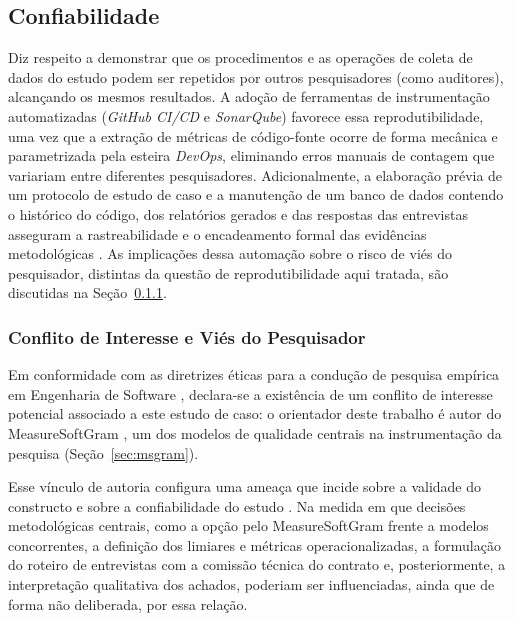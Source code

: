 \subsection{Confiabilidade}

Diz respeito a demonstrar que os procedimentos e as operações de coleta de dados do estudo podem ser repetidos por outros pesquisadores (como auditores), alcançando os mesmos resultados. A adoção de ferramentas de instrumentação automatizadas (\textit{GitHub CI/CD} e \textit{SonarQube}) favorece essa reprodutibilidade, uma vez que a extração de métricas de código-fonte ocorre de forma mecânica e parametrizada pela esteira \textit{DevOps}, eliminando erros manuais de contagem que variariam entre diferentes pesquisadores. Adicionalmente, a elaboração prévia de um protocolo de estudo de caso e a manutenção de um banco de dados contendo o histórico do código, dos relatórios gerados e das respostas das entrevistas asseguram a rastreabilidade e o encadeamento formal das evidências metodológicas \cite{yin2001estudo}. As implicações dessa automação sobre o risco de viés do pesquisador, distintas da questão de reprodutibilidade aqui tratada, são discutidas na Seção~\ref{sec:conflito_interesse_marcio}.

\subsubsection{Conflito de Interesse e Viés do Pesquisador}
\label{sec:conflito_interesse_marcio}

Em conformidade com as diretrizes éticas para a condução de pesquisa empírica em Engenharia de Software , declara-se a existência de um conflito de interesse potencial associado a este estudo de caso: o orientador deste trabalho é autor do MeasureSoftGram \cite{neri2018,neri2020}, um dos modelos de qualidade centrais na instrumentação da pesquisa (Seção~\ref{sec:msgram}).

Esse vínculo de autoria configura uma ameaça que incide sobre a validade do constructo e sobre a confiabilidade do estudo  \cite{Runeson_Host}. Na medida em que decisões metodológicas centrais, como a opção pelo MeasureSoftGram frente a modelos concorrentes, a definição dos limiares e métricas operacionalizadas, a formulação do roteiro de entrevistas com a comissão técnica do contrato e, posteriormente, a interpretação qualitativa dos achados, poderiam ser influenciadas, ainda que de forma não deliberada, por essa relação. 

